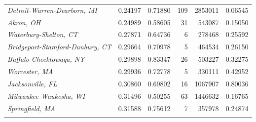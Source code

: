 \begin{table}[!h]
{\begin{tabular}[t]{>{}lrrrrr}
\addlinespace[0.2em]
\hspace{1em}\em{Detroit-Warren-Dearborn, MI} & 0.24197 & 0.71880 & 109 & 2853011 & 0.06545\\
\addlinespace[0.2em]
\hspace{1em}\em{Akron, OH} & 0.24989 & 0.58605 & 31 & 543087 & 0.15050\\
\addlinespace[0.2em]
\hspace{1em}\em{Waterbury-Shelton, CT} & 0.27871 & 0.64736 & 6 & 278468 & 0.25592\\
\addlinespace[0.2em]
\hspace{1em}\em{Bridgeport-Stamford-Danbury, CT} & 0.29664 & 0.70978 & 5 & 464534 & 0.26150\\
\addlinespace[0.2em]
\hspace{1em}\em{Buffalo-Cheektowaga, NY} & 0.29898 & 0.83347 & 26 & 503227 & 0.32275\\
\addlinespace[0.2em]
\hspace{1em}\em{Worcester, MA} & 0.29936 & 0.72778 & 5 & 330111 & 0.42952\\
\addlinespace[0.2em]
\hspace{1em}\em{Jacksonville, FL} & 0.30860 & 0.69802 & 16 & 1067907 & 0.80036\\
\addlinespace[0.2em]
\hspace{1em}\em{Milwaukee-Waukesha, WI} & 0.31496 & 0.50255 & 63 & 1446632 & 0.16765\\
\addlinespace[0.2em]
\hspace{1em}\em{Springfield, MA} & 0.31588 & 0.75612 & 7 & 357978 & 0.24874\\
\addlinespace[0.2em]
\bottomrule
\end{tabular}}
\end{table}

